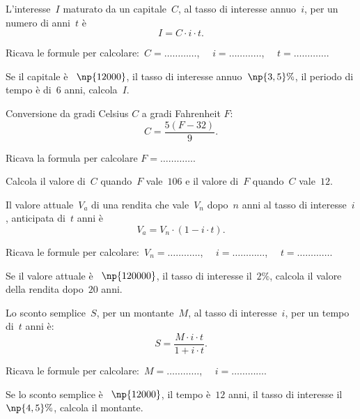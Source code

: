 
\begin{esercizio}
\label{ese:17.63}
L'interesse~$I$ maturato da un capitale~$C$, al tasso di interesse annuo~$i$, per un numero di anni~$t$ è
\begin{equation*}
  I=C\cdot i\cdot t.
\end{equation*}

Ricava le formule per calcolare:~$C=\ldots\ldots\ldots\ldots$, $\quad i=\ldots\ldots\ldots\ldots$, $\quad t =\ldots\ldots\ldots\ldots$.

Se il capitale è \officialeuro~$\np{12000}$, il tasso di interesse annuo~$\np{3,5}\%$, il periodo di tempo è di~$6$ anni, calcola~$I$.
\end{esercizio}

\begin{esercizio}
\label{ese:17.64}
Conversione da gradi Celsius $C$ a gradi Fahrenheit $F$:
\begin{equation*}
  C=\frac{5(F-32)}{9}.
\end{equation*}

Ricava la formula per calcolare $F=\ldots\ldots\ldots\ldots$.

Calcola il valore di~$C$ quando~$F$ vale~$106$ e il valore di~$F$ quando~$C$ vale~$12$.
\end{esercizio}

\begin{esercizio}
\label{ese:17.65}
Il valore attuale~$V_a$ di una rendita che vale~$V_n$ dopo~$n$ anni al tasso di interesse~$i$, anticipata di~$t$ anni è
\begin{equation*}
  V_{a}=V_{n}\cdot (1-i\cdot t).
\end{equation*}

Ricava le formule per calcolare:~$V_n=\ldots\ldots\ldots\ldots$, $\quad i=\ldots\ldots\ldots\ldots$, $\quad t =\ldots\ldots\ldots\ldots$.

Se il valore attuale è \officialeuro~$\np{120000}$, il tasso di interesse il~$2\%$, calcola il valore della rendita dopo~$20$ anni.
\end{esercizio}

\begin{esercizio}
\label{ese:17.66}
Lo sconto semplice~$S$, per un montante~$M$, al tasso di interesse~$i$, per un tempo di~$t$ anni è:
\begin{equation*}
  S=\frac{M\cdot i\cdot t}{1+i\cdot t}.
\end{equation*}

Ricava le formule per calcolare:~$M=\ldots\ldots\ldots\ldots$, $\quad i=\ldots\ldots\ldots\ldots$.

Se lo sconto semplice è \officialeuro~$\np{12000}$, il tempo è~$12$ anni, il tasso di interesse il~$\np{4,5}\%$, calcola il montante.
\end{esercizio}

